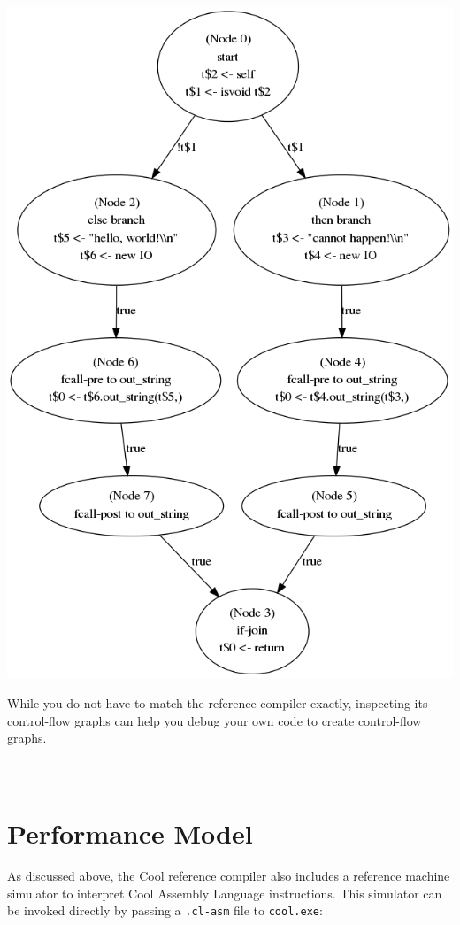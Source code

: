 \documentclass[]{article}
\begin{document}
\includegraphics{cfg-example.png}

While you do not have to match the reference compiler exactly,
inspecting its control-flow graphs can help you debug your own code to
create control-flow graphs.

\section{\\ Performance Model}

As discussed above, the Cool reference compiler also includes a
reference machine simulator to interpret Cool Assembly Language
instructions. This simulator can be invoked directly by passing a
\texttt{.cl-asm} file to \texttt{cool.exe}:
\end{document}
